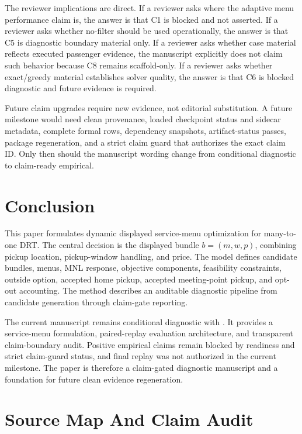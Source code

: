 \documentclass[a4paper,fleqn,review]{cas-dc}
\newcommand{\code}[1]{\texttt{\detokenize{#1}}}
\begin{document}
The reviewer implications are direct. If a reviewer asks where the adaptive
menu performance claim is, the answer is that C1 is blocked and not asserted.
If a reviewer asks whether no-filter should be used operationally, the answer
is that C5 is diagnostic boundary material only. If a reviewer asks whether
case material reflects executed passenger evidence, the manuscript explicitly
does not claim such behavior because C8 remains scaffold-only. If a reviewer
asks whether exact/greedy material establishes solver quality, the answer is
that C6 is blocked diagnostic and future evidence is required.

Future claim upgrades require new evidence, not editorial substitution. A
future milestone would need clean provenance, loaded checkpoint status and
sidecar metadata, complete formal rows, dependency snapshots, artifact-status
passes, package regeneration, and a strict claim guard that authorizes the
exact claim ID. Only then should the manuscript wording change from
conditional diagnostic to claim-ready empirical.

\section{Conclusion}

This paper formulates dynamic displayed service-menu optimization for
many-to-one DRT. The central decision is the displayed bundle $b=(m,w,p)$,
combining pickup location, pickup-window handling, and price. The model
defines candidate bundles, menus, MNL response, objective components,
feasibility constraints, outside option, accepted home pickup, accepted
meeting-point pickup, and opt-out accounting. The method describes an
auditable diagnostic pipeline from candidate generation through claim-gate
reporting.

The current manuscript remains conditional diagnostic with
\code{claim_ready=false}. It provides a service-menu formulation, paired-replay
evaluation architecture, and transparent claim-boundary audit. Positive
empirical claims remain blocked by readiness and strict claim-guard status,
and final replay was not authorized in the current milestone. The paper is
therefore a claim-gated diagnostic manuscript and a foundation for future
clean evidence regeneration.

\appendix

\section{Source Map And Claim Audit}
\end{document}
